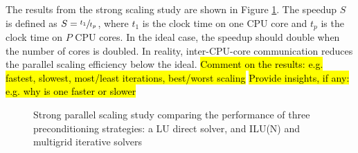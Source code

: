 \documentclass[sn-mathphys,Numbered]{sn-jnl}%
\begin{document}
The results from the strong scaling study are shown in Figure \ref{fig:parallelisation_strong}.
The speedup $S$ is defined as $S = \sfrac{t_1}{t_p}$, where $t_1$ is the clock time on one CPU core and $t_p$ is the clock time on $P$ CPU cores.
In the ideal case, the speedup should double when the number of cores is doubled.
In reality, inter-CPU-core communication reduces the parallel scaling efficiency below the ideal.
\hl{Comment on the results: e.g. fastest, slowest, most/least iterations, best/worst scaling}
\hl{Provide insights, if any: e.g. why is one faster or slower}
\begin{figure}[htbp]
	\centering
	\caption{Strong parallel scaling study comparing the performance of three preconditioning strategies: a LU direct solver, and ILU(N) and multigrid iterative solvers}
	\label{fig:parallelisation_strong}
\end{figure}
\end{document}
